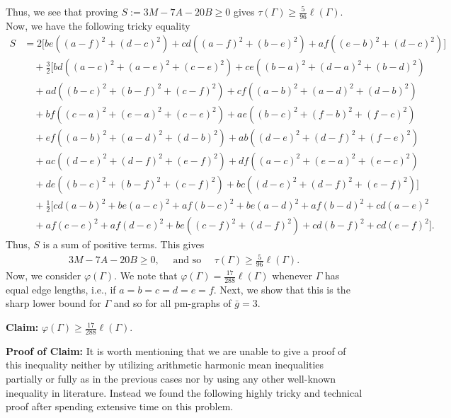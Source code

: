 \documentclass[12pt]{amsart}
\theoremstyle{example}
\theoremstyle{definition}
\theoremstyle{notation}
\begin{document}
Thus, we see that proving $S:=3M-7A-20B \geq 0$ gives  ${\tau(\Gamma)} \geq \frac{5}{96} {\ell ({\Gamma})} $. Now, we have the following tricky equality
\begin{equation*}\label{eqn tau1}
\begin{split}
S&= 2 \big[ b e \left((a-f)^2+(d-c)^2\right)+c d \left((a-f)^2+(b-e)^2\right)+a f \left((e-b)^2+(d-c)^2\right) \big]\\
& \quad + \frac{3}{2}  \big[ b d \left((a-c)^2+(a-e)^2+(c-e)^2\right)+c e \left((b-a)^2+(d-a)^2+(b-d)^2\right)\\
& \quad + a d \left((b-c)^2+(b-f)^2+(c-f)^2\right)+c f \left((a-b)^2+(a-d)^2+(d-b)^2\right)\\
& \quad +b f \left((c-a)^2+(e-a)^2+(c-e)^2\right)+a e \left((b-c)^2+(f-b)^2+(f-c)^2\right)\\
& \quad +e f \left((a-b)^2+(a-d)^2+(d-b)^2\right)+a b \left((d-e)^2+(d-f)^2+(f-e)^2\right)\\
& \quad +a c \left((d-e)^2+(d-f)^2+(e-f)^2\right)+d f \left((a-c)^2+(e-a)^2+(e-c)^2\right)\\
& \quad +d e \left((b-c)^2+(b-f)^2+(c-f)^2\right)+b c \left((d-e)^2+(d-f)^2+(e-f)^2\right)\big]\\
& \quad + \frac{1}{2} \big[ c d (a-b)^2+b e (a-c)^2+a f (b-c)^2+b e (a-d)^2+a f (b-d)^2+c d (a-e)^2\\
& \quad +a f (c-e)^2+a f (d-e)^2+b e \left((c-f)^2+(d-f)^2\right)+c d (b-f)^2+c d (e-f)^2 \big].
\end{split}
\end{equation*}
Thus, $S$ is a sum of positive terms. This gives
\begin{equation}\label{eqn tau0}
\begin{split}
3M-7A-20B \geq 0, \quad  \text{ and so } \quad  {\tau(\Gamma)} \geq \frac{5}{96} {\ell ({\Gamma})}.
\end{split}
\end{equation}
Now, we consider ${\varphi ({\Gamma})}$.
We note that ${\varphi ({\Gamma})} = \frac{17}{288} {\ell ({\Gamma})}$ whenever ${\Gamma}$ has equal edge lengths, i.e., if $a=b=c=d=e=f$. Next, we show that this is the sharp lower bound for ${\Gamma}$ and so for all pm-graphs of ${\bar{g}}=3$.

\textbf{Claim:} ${\varphi ({\Gamma})} \geq \frac{17}{288} {\ell ({\Gamma})}$.

\textbf{Proof of Claim:}
It is worth mentioning that we are unable to give a proof of this inequality neither by utilizing arithmetic harmonic mean inequalities partially or fully as in the previous cases nor by using any other well-known inequality in literature. Instead we found the following highly tricky and technical proof after spending extensive time on this problem.
\end{document}
